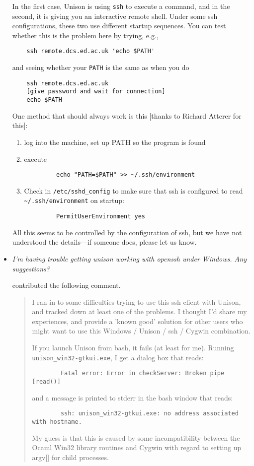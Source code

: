 \begin{itemize}
In the first case, Unison is using {\tt ssh} to execute a command, and
in the second, it is giving you an interactive remote shell.  Under
some ssh configurations, these two use different startup sequences.
You can test whether this is the problem here by trying, e.g.,
\begin{verbatim}
    ssh remote.dcs.ed.ac.uk 'echo $PATH'
\end{verbatim}
and seeing whether your {\tt PATH} is the same as when you do
\begin{verbatim}
    ssh remote.dcs.ed.ac.uk 
    [give password and wait for connection]
    echo $PATH
\end{verbatim}

One method that should always work is this [thanks to Richard Atterer for
this]:
\begin{enumerate}
\item log into the machine, set up PATH so the program is found
\item execute
\begin{verbatim}
         echo "PATH=$PATH" >> ~/.ssh/environment
\end{verbatim}
\item Check in \verb|/etc/sshd_config| to make sure that ssh is configured
to read \verb|~/.ssh/environment| on startup:
\begin{verbatim}
         PermitUserEnvironment yes
\end{verbatim}
\end{enumerate}

All this seems to be controlled by the configuration of ssh, but we have
not understood the details---if someone does, please let us know.

\item {\em I'm having trouble getting unison working with openssh
    under Windows.  Any suggestions?}
  
  contributed the following comment.
  \begin{quote}
    I ran in to some difficulties trying to use this ssh client with
    Unison, and tracked down at least one of the problems.  I thought
    I'd share my experiences, and provide a 'known good' solution for
    other users who might want to use this Windows / Unison / ssh /
    Cygwin combination.
    
    If you launch Unison from bash, it fails (at least for me).
    Running \verb+unison_win32-gtkui.exe+, I get a dialog box that
    reads:
\begin{verbatim}
        Fatal error: Error in checkServer: Broken pipe [read()]
\end{verbatim}
    and a message is printed to stderr in the bash window that reads:
\begin{verbatim}
        ssh: unison_win32-gtkui.exe: no address associated with hostname.
\end{verbatim}
    My guess is that this is caused by some incompatibility between
    the Ocaml Win32 library routines and Cygwin with regard to setting
    up argv[] for child processes.
  \end{quote}


\end{itemize}

